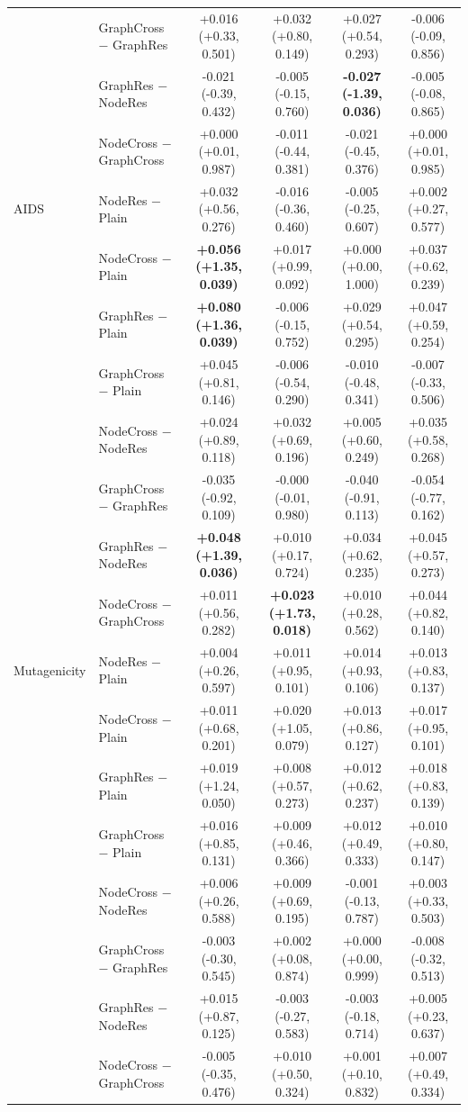 \begin{table}[t]
\begin{tabular}{llcccc}
 & GraphCross $-$ GraphRes & +0.016 (+0.33, 0.501) & +0.032 (+0.80, 0.149) & +0.027 (+0.54, 0.293) & -0.006 (-0.09, 0.856) \\
 & GraphRes $-$ NodeRes & -0.021 (-0.39, 0.432) & -0.005 (-0.15, 0.760) & \textbf{-0.027 (-1.39, 0.036)} & -0.005 (-0.08, 0.865) \\
 & NodeCross $-$ GraphCross & +0.000 (+0.01, 0.987) & -0.011 (-0.44, 0.381) & -0.021 (-0.45, 0.376) & +0.000 (+0.01, 0.985) \\
\midrule
AIDS & NodeRes $-$ Plain & +0.032 (+0.56, 0.276) & -0.016 (-0.36, 0.460) & -0.005 (-0.25, 0.607) & +0.002 (+0.27, 0.577) \\
 & NodeCross $-$ Plain & \textbf{+0.056 (+1.35, 0.039)} & +0.017 (+0.99, 0.092) & +0.000 (+0.00, 1.000) & +0.037 (+0.62, 0.239) \\
 & GraphRes $-$ Plain & \textbf{+0.080 (+1.36, 0.039)} & -0.006 (-0.15, 0.752) & +0.029 (+0.54, 0.295) & +0.047 (+0.59, 0.254) \\
 & GraphCross $-$ Plain & +0.045 (+0.81, 0.146) & -0.006 (-0.54, 0.290) & -0.010 (-0.48, 0.341) & -0.007 (-0.33, 0.506) \\
 & NodeCross $-$ NodeRes & +0.024 (+0.89, 0.118) & +0.032 (+0.69, 0.196) & +0.005 (+0.60, 0.249) & +0.035 (+0.58, 0.268) \\
 & GraphCross $-$ GraphRes & -0.035 (-0.92, 0.109) & -0.000 (-0.01, 0.980) & -0.040 (-0.91, 0.113) & -0.054 (-0.77, 0.162) \\
 & GraphRes $-$ NodeRes & \textbf{+0.048 (+1.39, 0.036)} & +0.010 (+0.17, 0.724) & +0.034 (+0.62, 0.235) & +0.045 (+0.57, 0.273) \\
 & NodeCross $-$ GraphCross & +0.011 (+0.56, 0.282) & \textbf{+0.023 (+1.73, 0.018)} & +0.010 (+0.28, 0.562) & +0.044 (+0.82, 0.140) \\
\midrule
Mutagenicity & NodeRes $-$ Plain & +0.004 (+0.26, 0.597) & +0.011 (+0.95, 0.101) & +0.014 (+0.93, 0.106) & +0.013 (+0.83, 0.137) \\
 & NodeCross $-$ Plain & +0.011 (+0.68, 0.201) & +0.020 (+1.05, 0.079) & +0.013 (+0.86, 0.127) & +0.017 (+0.95, 0.101) \\
 & GraphRes $-$ Plain & +0.019 (+1.24, 0.050) & +0.008 (+0.57, 0.273) & +0.012 (+0.62, 0.237) & +0.018 (+0.83, 0.139) \\
 & GraphCross $-$ Plain & +0.016 (+0.85, 0.131) & +0.009 (+0.46, 0.366) & +0.012 (+0.49, 0.333) & +0.010 (+0.80, 0.147) \\
 & NodeCross $-$ NodeRes & +0.006 (+0.26, 0.588) & +0.009 (+0.69, 0.195) & -0.001 (-0.13, 0.787) & +0.003 (+0.33, 0.503) \\
 & GraphCross $-$ GraphRes & -0.003 (-0.30, 0.545) & +0.002 (+0.08, 0.874) & +0.000 (+0.00, 0.999) & -0.008 (-0.32, 0.513) \\
 & GraphRes $-$ NodeRes & +0.015 (+0.87, 0.125) & -0.003 (-0.27, 0.583) & -0.003 (-0.18, 0.714) & +0.005 (+0.23, 0.637) \\
 & NodeCross $-$ GraphCross & -0.005 (-0.35, 0.476) & +0.010 (+0.50, 0.324) & +0.001 (+0.10, 0.832) & +0.007 (+0.49, 0.334) \\
\bottomrule
\end{tabular}
\end{table}